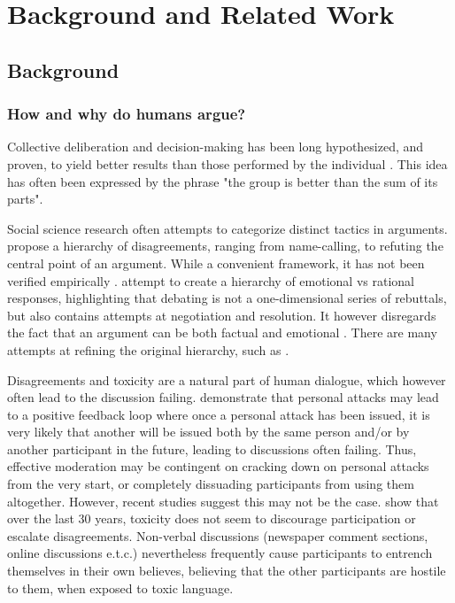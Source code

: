 %
\chapter{Background and Related Work}
\label{sec:related}



\section{Background}
\label{sec:related:sec1}


\subsection{How and why do humans argue?}
\label{sec:background:arguments-how}

Collective deliberation and decision-making has been long hypothesized, and proven, to yield better results than those performed by the individual \cite{david-collaborative, stefan-dissent}. This idea has often been expressed by the phrase "the group is better than the sum of its parts". 

Social science research often attempts to categorize distinct tactics in arguments. \cite{graham2008disagree} propose a hierarchy of disagreements, ranging from name-calling, to refuting the central point of an argument.  While a convenient framework, it has not been verified empirically \cite{dekock2022disagree}. \cite{walker-etal-2012-corpus} attempt to create a hierarchy of emotional vs rational responses, highlighting that debating is not a one-dimensional series of rebuttals, but also contains attempts at negotiation and resolution. It however disregards the fact that an argument can be both factual and emotional \cite{dekock2022disagree}. There are many attempts at refining the original hierarchy, such as \cite{benesch2016counterspeech}.

Disagreements and toxicity are a natural part of human dialogue, which however often lead to the discussion failing. \cite{dekock2022disagree} demonstrate that personal attacks may lead to a positive feedback loop where once a personal attack has been issued, it is very likely that another will be issued both by the same person and/or by another participant in the future, leading to discussions often failing. Thus, effective moderation may be contingent on cracking down on personal attacks from the very start, or completely dissuading participants from using them altogether. However, recent studies suggest this may not be the case. \cite{Avalle2024PersistentIP} show that over the last 30 years, toxicity does not seem to discourage participation or escalate disagreements. Non-verbal discussions (newspaper comment sections, online discussions e.t.c.) nevertheless frequently cause participants to entrench themselves in their own believes, believing that the other participants are hostile to them, when exposed to toxic language.

